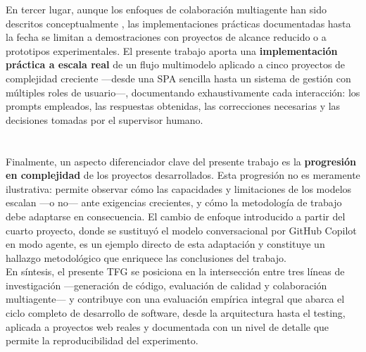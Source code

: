 En tercer lugar, aunque los enfoques de colaboración multiagente han sido descritos conceptualmente \cite{Turunen:2023:FromIdeas}, las implementaciones prácticas documentadas hasta la fecha se limitan a demostraciones con proyectos de alcance reducido o a prototipos experimentales. El presente trabajo aporta una \textbf{implementación práctica a escala real} de un flujo multimodelo aplicado a cinco proyectos de complejidad creciente ---desde una \ac{SPA} sencilla hasta un sistema de gestión con múltiples roles de usuario---, documentando exhaustivamente cada interacción: los prompts empleados, las respuestas obtenidas, las correcciones necesarias y las decisiones tomadas por el supervisor humano.\\\\\\

Finalmente, un aspecto diferenciador clave del presente trabajo es la \textbf{progresión en complejidad} de los proyectos desarrollados. Esta progresión no es meramente ilustrativa: permite observar cómo las capacidades y limitaciones de los modelos escalan ---o no--- ante exigencias crecientes, y cómo la metodología de trabajo debe adaptarse en consecuencia. El cambio de enfoque introducido a partir del cuarto proyecto, donde se sustituyó el modelo conversacional por GitHub Copilot en modo agente, es un ejemplo directo de esta adaptación y constituye un hallazgo metodológico que enriquece las conclusiones del trabajo.\\

En síntesis, el presente TFG se posiciona en la intersección entre tres líneas de investigación ---generación de código, evaluación de calidad y colaboración multiagente--- y contribuye con una evaluación empírica integral que abarca el ciclo completo de desarrollo de software, desde la arquitectura hasta el testing, aplicada a proyectos web reales y documentada con un nivel de detalle que permite la reproducibilidad del experimento.\\

